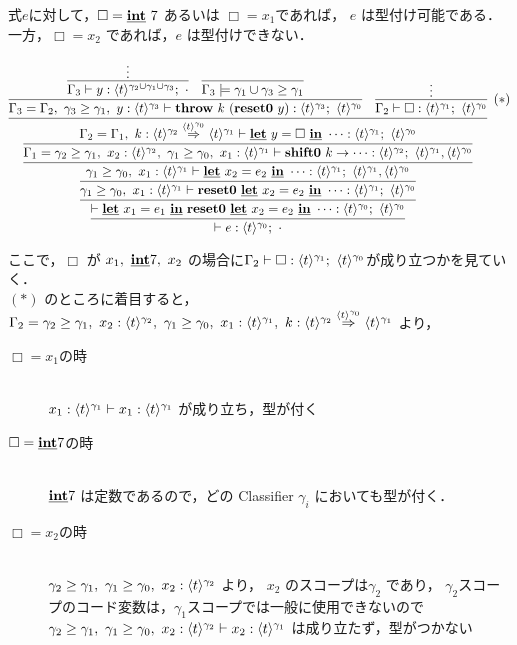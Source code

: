 式$e$に対して，$\Box=\underline{\textbf{int}}~ 7$ あるいは $\Box=x_1$であれば，
$e$ は型付け可能である．
一方，$\Box=x_2$ であれば，$e$ は型付けできない．

\newcommand\tzero{\codeT{t}{\gamma_0}}
\newcommand\tone{\codeT{t}{\gamma_1}}
\newcommand\ttwo{\codeT{t}{\gamma_2}}
\newcommand\tthree{\codeT{t}{\gamma_3}}
\newcommand\tonethree{\codeT{t}{\gamma_1\uni\gamma_3}}
\newcommand\tall{\codeT{t}{\gamma_2\uni\gamma_1\uni\gamma_3}}
\newcommand\Gammaone{
  \longer{\gamma_1}{\gamma_0},~x_1:\tone \vdash
  \cLet~x_2=e_2~\cIn~\cdots : \tone;~\tone,\tzero}
\newcommand\Gammatwo{
  \Gamma_1,~k_2:\contT{\ttwo}{\tone}{\tzero},
  ~k_1:\contT{\tone}{\tzero}{\cdot{}}}

\def\proofone{
  \infer
  {\vdash e:\tzero;~\cdot{}}
  {
    \infer{\vdash \cLet~x_1=e_1~\cIn~\Resetz~\cLet~x_2=e_2~\cIn~\cdots :
      \tzero;~\tzero
    }
    {\infer{\longer{\gamma_1}{\gamma_0},~x_1:\tone \vdash
        \Resetz~\cLet~x_2=e_2~\cIn~\cdots : \tone;~\tzero
      }
      {\prooftwo}
    }
  }
}
\def\prooftwo{
  \infer{\longer{\gamma_1}{\gamma_0},~x_1:\tone \vdash
    \cLet~x_2=e_2~\cIn~\cdots : \tone;~\tone,\tzero}
  {\infer{\Gamma_1=\longer{\gamma_2}{\gamma_1},~x_2:\ttwo,~\longer{\gamma_1}{\gamma_0},~x_1:\tone \vdash
      \shiftz{k}{\cdots} : \ttwo;~\tone,\tzero
    }
    {\proofthree}
  }
}

\def\proofthree{
  {\infer{\Gamma_2=\Gamma_1,~k:\contT{\ttwo}{\tone}{\tzero}
      \vdash \cLet~y=\Box~\cIn~\cdots : \tone;~\tzero
    }
    {\prooffour}
  }
}

\def\prooffour{
  \infer{\Gamma_3=\Gamma_2,~\longer{\gamma_3}{\gamma_1},~y:\tthree \vdash \throw{k}{(\Resetz~ y)} :
    \tthree;~\tzero}
  {\infer{\Gamma_3 \vdash y : \tall;~\cdot}{\vdots}
    & \infer{\Gamma_3 \models \longer{\gamma_1\uni\gamma_3}{\gamma_1}}{}
  }
  & \infer[(*)]{\Gamma_2 \vdash \Box : \tone;~ \tzero}{\vdots}
}

\[
  \proofone
\]

ここで，$\Box$ が $x_1,~ \underline{\textbf{int}} 7,~ x_2$ の場合に$\Gamma_2 \vdash \Box : \tone;~ \tzero$が成り立つかを見ていく．\\
$(*)$ のところに着目すると，
$\Gamma_2 = \longer{\gamma_2}{\gamma_1},~x_2:\ttwo,~\longer{\gamma_1}{\gamma_0},~x_1:\tone,~k:\contT{\ttwo}{\tone}{\tzero}$
より，
\begin{description}
\item[$\Box=x_1$の時]\mbox{}\\
  $x_1:\tone \vdash x_1:\tone$ が成り立ち，型が付く
\item[$\Box= \underline{\textbf{int}} 7$の時]\mbox{}\\
  $\underline{\textbf{int}} 7$ は定数であるので，どの Classifier $\gamma_i$ においても型が付く．
\item[$\Box=x_2$の時]\mbox{}\\
  $\longer{\gamma_2}{\gamma_1},~\longer{\gamma_1}{\gamma_0},~x_2:\ttwo$ より，
  $x_2$ のスコープは$\gamma_2$ であり，
  $\gamma_2$スコープのコード変数は，$\gamma_1$スコープでは一般に使用できないので
  $\longer{\gamma_2}{\gamma_1},~\longer{\gamma_1}{\gamma_0},~x_2:\ttwo \vdash x_2:\tone$ は成り立たず，型がつかない
\end{description}

